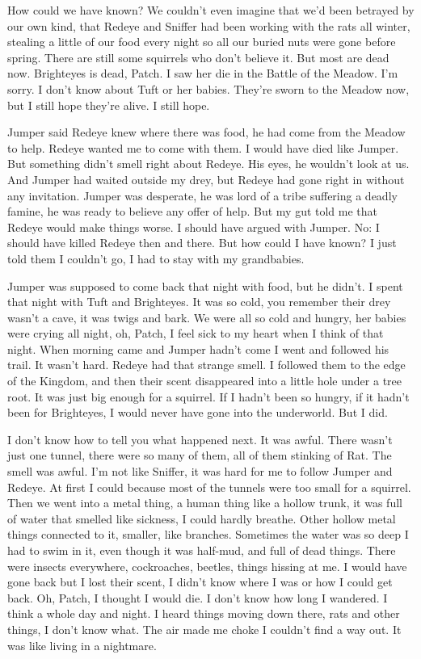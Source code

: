 \documentclass[ebook,oneside,openany,17pt]{memoir}
\begin{document}
How could we have known? We couldn’t even imagine that we’d been
betrayed by our own kind, that Redeye and Sniffer had been working
with the rats all winter, stealing a little of our food every night so
all our buried nuts were gone before spring. There are still some
squirrels who don’t believe it. But most are dead now. Brighteyes is
dead, Patch. I saw her die in the Battle of the Meadow. I’m sorry. I
don’t know about Tuft or her babies. They’re sworn to the Meadow now,
but I still hope they’re alive. I still hope.

Jumper said Redeye knew where there was food, he had come from the
Meadow to help. Redeye wanted me to come with them. I would have died
like Jumper. But something didn’t smell right about Redeye. His eyes,
he wouldn’t look at us. And Jumper had waited outside my drey, but
Redeye had gone right in without any invitation. Jumper was desperate,
he was lord of a tribe suffering a deadly famine, he was ready to
believe any offer of help. But my gut told me that Redeye would make
things worse. I should have argued with Jumper. No: I should have
killed Redeye then and there. But how could I have known? I just told
them I couldn’t go, I had to stay with my grandbabies.

Jumper was supposed to come back that night with food, but he
didn’t. I spent that night with Tuft and Brighteyes. It was so cold,
you remember their drey wasn’t a cave, it was twigs and bark. We were
all so cold and hungry, her babies were crying all night, oh, Patch, I
feel sick to my heart when I think of that night. When morning came
and Jumper hadn’t come I went and followed his trail. It wasn’t
hard. Redeye had that strange smell. I followed them to the edge of
the Kingdom, and then their scent disappeared into a little hole under
a tree root. It was just big enough for a squirrel. If I hadn’t been
so hungry, if it hadn’t been for Brighteyes, I would never have gone
into the underworld. But I did.

I don’t know how to tell you what happened next. It was awful. There
wasn’t just one tunnel, there were so many of them, all of them
stinking of Rat. The smell was awful. I’m not like Sniffer, it was
hard for me to follow Jumper and Redeye. At first I could because most
of the tunnels were too small for a squirrel. Then we went into a
metal thing, a human thing like a hollow trunk, it was full of water
that smelled like sickness, I could hardly breathe. Other hollow metal
things connected to it, smaller, like branches. Sometimes the water
was so deep I had to swim in it, even though it was half-mud, and full
of dead things. There were insects everywhere, cockroaches, beetles,
things hissing at me. I would have gone back but I lost their scent, I
didn’t know where I was or how I could get back. Oh, Patch, I thought
I would die. I don’t know how long I wandered. I think a whole day and
night. I heard things moving down there, rats and other things, I
don’t know what. The air made me choke I couldn’t find a way out. It
was like living in a nightmare.
\end{document}
